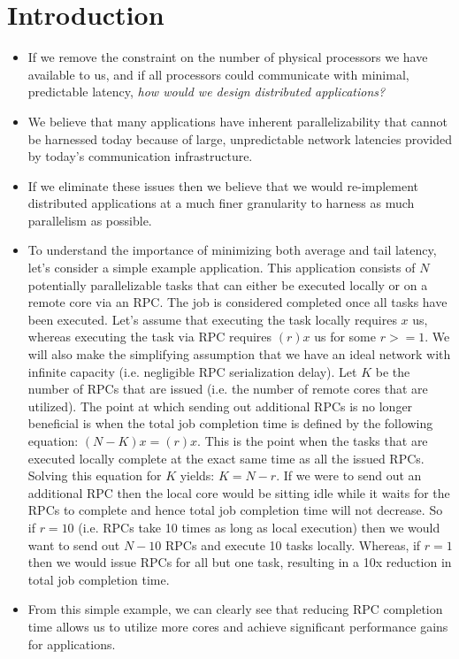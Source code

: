 \section{Introduction}
\begin{itemize}
    \item If we remove the constraint on the number of physical processors we have available to us, and if all processors could communicate with minimal, predictable latency, \emph{how would we design distributed applications?}
    \item We believe that many applications have inherent parallelizability that cannot be harnessed today because of large, unpredictable network latencies provided by today's communication infrastructure.
    \item If we eliminate these issues then we believe that we would re-implement distributed applications at a much finer granularity to harness as much parallelism as possible.
    \item To understand the importance of minimizing both average and tail latency, let's consider a simple example application. This application consists of $N$ potentially parallelizable tasks that can either be executed locally or on a remote core via an RPC. The job is considered completed once all tasks have been executed. Let's assume that executing the task locally requires $x$ us, whereas executing the task via RPC requires $(r)x$ us for some $r>=1$. We will also make the simplifying assumption that we have an ideal network with infinite capacity (i.e. negligible RPC serialization delay). Let $K$ be the number of RPCs that are issued (i.e. the number of remote cores that are utilized). The point at which sending out additional RPCs is no longer beneficial is when the total job completion time is defined by the following equation: $(N - K)x = (r)x$. This is the point when the tasks that are executed locally complete at the exact same time as all the issued RPCs. Solving this equation for $K$ yields: $K = N - r$. If we were to send out an additional RPC then the local core would be sitting idle while it waits for the RPCs to complete and hence total job completion time will not decrease. So if $r = 10$ (i.e. RPCs take 10 times as long as local execution) then we would want to send out $N-10$ RPCs and execute 10 tasks locally. Whereas, if $r = 1$ then we would issue RPCs for all but one task, resulting in a 10x reduction in total job completion time.
    \item From this simple example, we can clearly see that reducing RPC completion time allows us to utilize more cores and achieve significant performance gains for applications.

\end{itemize}
